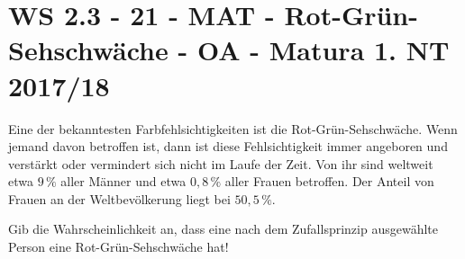 \section{WS 2.3 - 21 - MAT - Rot-Grün-Sehschwäche - OA - Matura 1. NT 2017/18}

\begin{beispiel}[WS 2.3]{1}
Eine der bekanntesten Farbfehlsichtigkeiten ist die Rot-Grün-Sehschwäche. Wenn jemand davon betroffen ist, dann ist diese Fehlsichtigkeit immer angeboren und verstärkt oder vermindert sich nicht im Laufe der Zeit. Von ihr sind weltweit etwa $9\,\%$ aller Männer und etwa $0,8\,\%$ aller Frauen betroffen. Der Anteil von Frauen an der Weltbevölkerung liegt bei $50,5\,\%$.

Gib die Wahrscheinlichkeit an, dass eine nach dem Zufallsprinzip ausgewählte Person eine Rot-Grün-Sehschwäche hat!

\end{beispiel}
